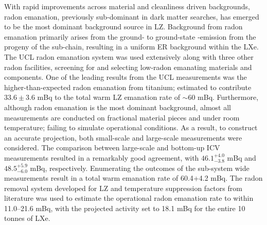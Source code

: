 With rapid improvements across material and cleanliness driven backgrounds, radon emanation, previously sub-dominant in dark matter searches, has emerged to be the most dominant background source in LZ. Background from radon emanation primarily arises from the ground- to ground-state \beta{}-emission from the \PbTOF{} progeny of the \RnTTT{} sub-chain, resulting in a uniform ER background within the LXe. The UCL radon emanation system was used extensively along with three other radon facilities, screening for and selecting low-radon emanating materials and components. One of the leading results from the UCL measurements was the higher-than-expected radon emanation from titanium; estimated to contribute $33.6\pm3.6$ mBq to the total warm LZ emanation rate of $\sim60$ mBq. Furthermore, although radon emanation is the most dominant background, almost all measurements are conducted on fractional material pieces and under room temperature; failing to simulate operational conditions. As a result, to construct an accurate projection, both small-scale and large-scale measurements were considered. The comparison between large-scale and bottom-up ICV measurements resulted in a remarkably good agreement, with $46.1^{+4.0}_{-3.8}$ mBq and $48.5^{+5.9}_{-6.0}$ mBq, respectively. Enumerating the outcomes of the sub-system wide measurements result in a total warm emanation rate of 60.4+4.2 mBq. The radon removal system developed for LZ and temperature suppression factors from literature was used to estimate the operational radon emanation rate to within 11.0--21.6 mBq, with the projected activity set to 18.1 mBq for the entire 10 tonnes of LXe. 

